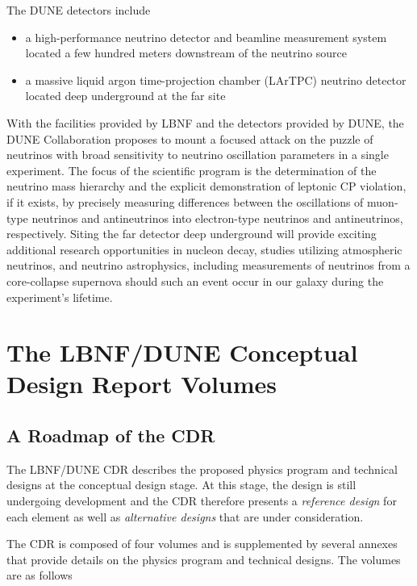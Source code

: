The DUNE detectors include
\begin{itemize}
\item a high-performance neutrino detector and beamline %
measurement system
located a few hundred meters downstream of the neutrino source
\item a massive liquid argon time-projection chamber (LArTPC) neutrino detector located deep underground at the far site
\end{itemize}

With the facilities provided by LBNF and the detectors provided by
DUNE, the DUNE Collaboration proposes to mount a focused attack on the
puzzle of neutrinos with broad sensitivity to neutrino oscillation
parameters in a single experiment.  The focus of the scientific
program is the  determination of
the neutrino mass hierarchy and the explicit demonstration of leptonic
CP violation, if it exists, by precisely measuring differences between
the oscillations of muon-type neutrinos and antineutrinos into
electron-type neutrinos and antineutrinos, respectively. Siting the far
detector deep underground will provide exciting additional research
opportunities in nucleon decay, studies utilizing atmospheric
neutrinos, and neutrino astrophysics, including measurements of
neutrinos from a core-collapse supernova should such an event occur in
our galaxy during the experiment's lifetime. 

\section{The LBNF/DUNE Conceptual Design Report Volumes}

\subsection{A Roadmap of the CDR}

The LBNF/DUNE CDR describes the proposed physics program and 
technical designs at the conceptual design stage.  At this stage, the design is
still undergoing development and the CDR therefore presents a \textit{reference design} 
for each element as well as \textit{alternative designs} that are under consideration.

The CDR is composed of four volumes and is supplemented by several annexes that 
provide details on the physics program and technical designs. The volumes are as follows

